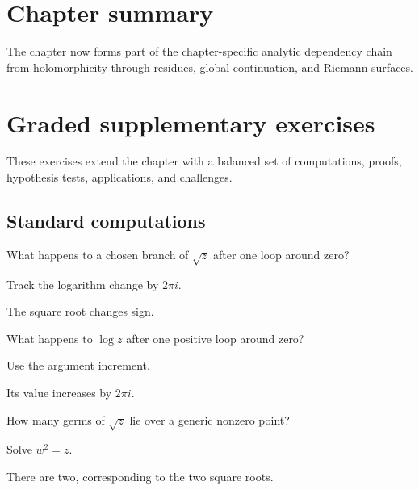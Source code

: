 \section*{Chapter summary}
The chapter now forms part of the chapter-specific analytic dependency chain from holomorphicity through residues, global continuation, and Riemann surfaces.
\section{Graded supplementary exercises}
These exercises extend the chapter with a balanced set of computations, proofs, hypothesis tests, applications, and challenges.

\subsection*{Standard computations}

\begin{exercise}\label{exr:iv22-expand-01}
What happens to a chosen branch of \(\sqrt z\) after one loop around zero?
\end{exercise}
\begin{hint}
Track the logarithm change by \(2\pi i\).
\end{hint}
\begin{solution}
The square root changes sign.
\end{solution}

\begin{exercise}\label{exr:iv22-expand-02}
What happens to \(\log z\) after one positive loop around zero?
\end{exercise}
\begin{hint}
Use the argument increment.
\end{hint}
\begin{solution}
Its value increases by \(2\pi i\).
\end{solution}

\begin{exercise}\label{exr:iv22-expand-03}
How many germs of \(\sqrt z\) lie over a generic nonzero point?
\end{exercise}
\begin{hint}
Solve \(w^2=z\).
\end{hint}
\begin{solution}
There are two, corresponding to the two square roots.
\end{solution}

